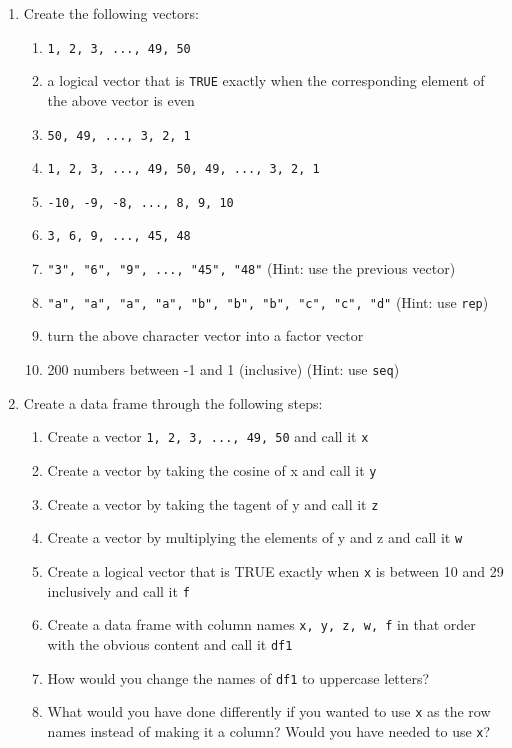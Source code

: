 \documentclass{article}
\begin{document}
\begin{enumerate}

\item Create the following vectors:
    \begin{enumerate}
    \item \texttt{1, 2, 3, ..., 49, 50}
    \item a logical vector that is \texttt{TRUE} exactly when the
          corresponding element of the above vector is even
    \item \texttt{50, 49, ..., 3, 2, 1}
    \item \texttt{1, 2, 3, ..., 49, 50, 49, ..., 3, 2, 1}
    \item \texttt{-10, -9, -8, ..., 8, 9, 10}
    \item \texttt{3, 6, 9, ..., 45, 48}
    \item \texttt{"3", "6", "9", ..., "45", "48"} \hspace{10mm}
          (Hint: use the previous vector) 
    \item \texttt{"a", "a", "a", "a", "b", "b", "b", "c", "c", "d"} \hspace{10mm}
          (Hint: use \texttt{rep})
    \item turn the above character vector into a factor vector 
    \item 200 numbers between -1 and 1 (inclusive) \hspace{10mm}
          (Hint: use \texttt{seq})
    \end{enumerate}

\item Create a data frame through the following steps:
    \begin{enumerate}
    \item Create a vector \texttt{1, 2, 3, ..., 49, 50} and call it \texttt{x}
    \item Create a vector by taking the cosine of x and call it \texttt{y}
    \item Create a vector by taking the tagent of y and call it \texttt{z}
    \item Create a vector by multiplying the elements of y and z and call it
          \texttt{w}
    \item Create a logical vector that is TRUE exactly when \texttt{x} is
          between 10 and 29 inclusively and call it \texttt{f}
    \item Create a data frame with column names \texttt{x, y, z, w, f} in
          that order with the obvious content and call it \texttt{df1}
    \item How would you change the names of \texttt{df1} to uppercase letters?
    \item What would you have done differently if you wanted to use \texttt{x}
          as the row names instead of making it a column?  Would you have
          needed to use \texttt{x}?
    \end{enumerate}


\end{enumerate}
\end{document}
